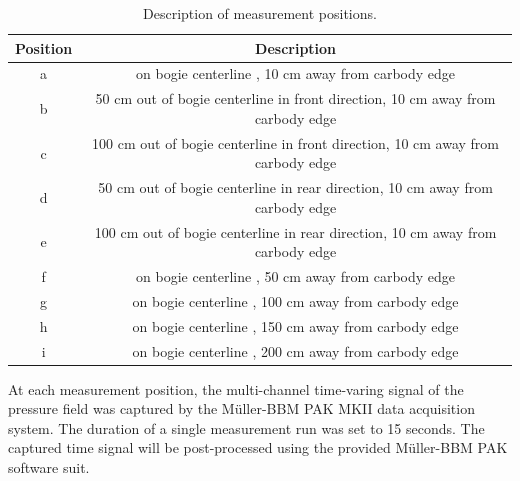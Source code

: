 \begin{table}[H]
	\begin{tabular}{cc}
		\toprule
		Position  & Description                                                                     \\
		\midrule
		a              & on bogie centerline , 10 cm away from carbody edge                              \\
		b              & 50 cm out of bogie centerline in front direction, 10 cm away from carbody edge  \\
		c              & 100 cm out of bogie centerline in front direction, 10 cm away from carbody edge \\
		d              & 50 cm out of bogie centerline in rear direction, 10 cm away from carbody edge   \\
		e              & 100 cm out of bogie centerline in rear direction, 10 cm away from carbody edge  \\
		f              & on bogie centerline , 50 cm away from carbody edge                              \\
		g              & on bogie centerline , 100 cm away from carbody edge                             \\
		h              & on bogie centerline , 150 cm away from carbody edge                             \\ 
		i              & on bogie centerline , 200 cm away from carbody edge                             \\ 
		\bottomrule
	\end{tabular}
	\caption{Description of measurement positions.}
	\label{tab:measurement_positons}
\end{table}
\noindent At each measurement position, the multi-channel time-varing signal of the pressure field was captured by the Müller-BBM PAK MKII data acquisition system. The duration of a single measurement run was set to 15 seconds. The captured time signal will be post-processed using the provided Müller-BBM PAK software suit.

